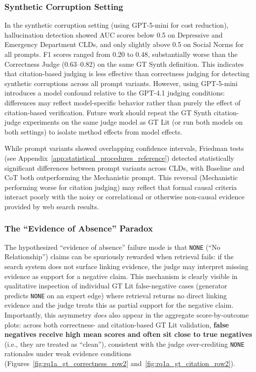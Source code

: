 \subsubsection{Synthetic Corruption Setting}

In the synthetic corruption setting (using GPT-5-mini for cost reduction), hallucination detection showed AUC scores below 0.5 on Depressive and Emergency Department CLDs, and only slightly above 0.5 on Social Norms for all prompts. F1 scores ranged from 0.20 to 0.48, substantially worse than the Correctness Judge (0.63--0.82) on the same GT Synth definition. This indicates that citation-based judging is less effective than correctness judging for detecting synthetic corruptions across all prompt variants. However, using GPT-5-mini introduces a model confound relative to the GPT-4.1 judging conditions: differences may reflect model-specific behavior rather than purely the effect of citation-based verification. Future work should repeat the GT Synth citation-judge experiments on the same judge model as GT Lit (or run both models on both settings) to isolate method effects from model effects.

While prompt variants showed overlapping confidence intervals, Friedman tests (see Appendix~\ref{app:statistical_procedures_reference}) detected statistically significant differences between prompt variants across CLDs, with Baseline and CoT both outperforming the Mechanistic prompt. This reversal (Mechanistic performing worse for citation judging) may reflect that formal causal criteria interact poorly with the noisy or correlational or otherwise non-causal evidence provided by web search results.

\subsubsection{The ``Evidence of Absence'' Paradox}

The hypothesized ``evidence of absence'' failure mode is that \texttt{NONE} (``No Relationship'') claims can be spuriously rewarded when retrieval fails: if the search system does not surface linking evidence, the judge may interpret missing evidence as support for a negative claim. This mechanism is clearly visible in qualitative inspection of individual GT Lit false-negative cases (generator predicts \texttt{NONE} on an expert edge) where retrieval returns no direct linking evidence and the judge treats this as partial support for the negative claim. Importantly, this asymmetry \textit{does} also appear in the aggregate score-by-outcome plots: across both correctness- and citation-based GT Lit validation, \textbf{false negatives receive high mean scores and often sit close to true negatives} (i.e., they are treated as ``clean''), consistent with the judge over-crediting \texttt{NONE} rationales under weak evidence conditions (Figures~\ref{fig:rq1a_gt_correctness_row2} and~\ref{fig:rq1a_gt_citation_row2}).

